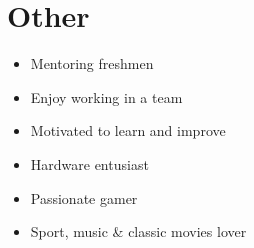 \documentclass[a4paper]{moderncv}
\begin{document}
\section{Other}
	\vspace{-0.9em}
	\begin{multicols*}{3}
		\begin{itemize}
			\setlength\itemsep{-1.2pt}
			\item Mentoring freshmen
			\item Enjoy working in a team
			\item Motivated to learn and improve
			\columnbreak
			\item Hardware entusiast
			\item Passionate gamer
			\item Sport, music \& classic movies lover
			\columnbreak
		\end{itemize}		
	\end{multicols*}
	
\end{document}
